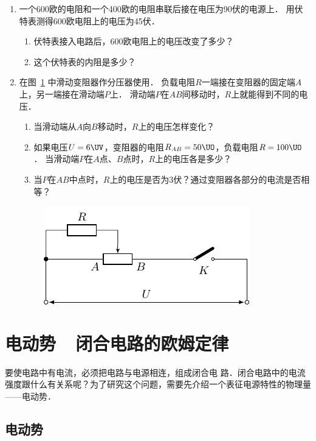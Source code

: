 \begin{enumerate}
    \item 一个600欧的电阻和一个400欧的电阻串联后接在电压为90伏的电源上．
    用伏特表测得600欧电阻上的电压为45伏．
    \begin{enumerate}
        \item 伏特表接入电路后，600欧电阻上的电压改变了多少？
        \item 这个伏特表的内阻是多少？
    \end{enumerate}
    \item 在图~\ref{fig_B_7-23} 中滑动变阻器作分压器使用．
    负载电阻$R$一端接在变阻器的固定端$A$上，另一端接在滑动端$P$上．
    滑动端$P$在$AB$间移动时，$R$上就能得到不同的电压．
    \begin{enumerate}
        \item 当滑动端从$A$向$B$移动时，$R$上的电压怎样变化？
        \item 如果电压$U=6 \UV$，变阻器的电阻$R_{AB}=50\UO$，负载电阻$R=100\UO$．
        当滑动端$P$在$A$点、$B$点时，$R$上的电压各是多少？
        \item 当$P$在$AB$中点时，$R$上的电压是否为3伏？通过变阻器各部分的电流是否相等？
    \end{enumerate}
    \begin{figure}[htbp]
    	\centering
    	\includegraphics{fig/B/7-23.pdf}
    	\caption{}\label{fig_B_7-23}
    \end{figure}
\end{enumerate}

\section{电动势~~闭合电路的欧姆定律}

要使电路中有电流，必须把电路与电源相连，组成闭合电
路．闭合电路中的电流强度跟什么有关系呢？为了研究这个问题，需要先介绍一个表征电源特性的物理量——电动势．

\subsection{电动势}


